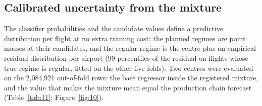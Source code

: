 \documentclass[
  manuscript=article,  %
  layout=preprint,     %
  year=2026,
  volume=4,
]{extra/joas}
\begin{document}
\subsection{Calibrated uncertainty from the mixture}\label{calibrated-uncertainty-from-the-mixture}

The classifier probabilities and the candidate values define a predictive distribution per flight at no extra training cost: the planned regimes are point masses at their candidates, and the regular regime is the centre plus an empirical residual distribution per airport (99 percentiles of the residual on flights whose true regime is regular, fitted on the other five folds). Two centres were evaluated on the 2,084,921 out-of-fold rows: the base regressor inside the registered mixture, and the value that makes the mixture mean equal the production chain forecast (Table~\ref{tab:11}; Figure~\ref{fig:10}).
\end{document}
